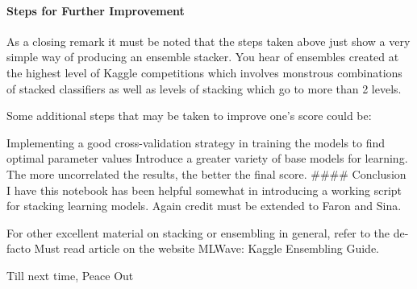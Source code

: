\documentclass[11pt]{article}
\begin{document}
    \paragraph{Steps for Further
Improvement}\label{steps-for-further-improvement}

As a closing remark it must be noted that the steps taken above just
show a very simple way of producing an ensemble stacker. You hear of
ensembles created at the highest level of Kaggle competitions which
involves monstrous combinations of stacked classifiers as well as levels
of stacking which go to more than 2 levels.

Some additional steps that may be taken to improve one's score could be:

Implementing a good cross-validation strategy in training the models to
find optimal parameter values Introduce a greater variety of base models
for learning. The more uncorrelated the results, the better the final
score. \#\#\#\# Conclusion I have this notebook has been helpful
somewhat in introducing a working script for stacking learning models.
Again credit must be extended to Faron and Sina.

For other excellent material on stacking or ensembling in general, refer
to the de-facto Must read article on the website MLWave: Kaggle
Ensembling Guide.

Till next time, Peace Out


    
    
    
    
\end{document}
